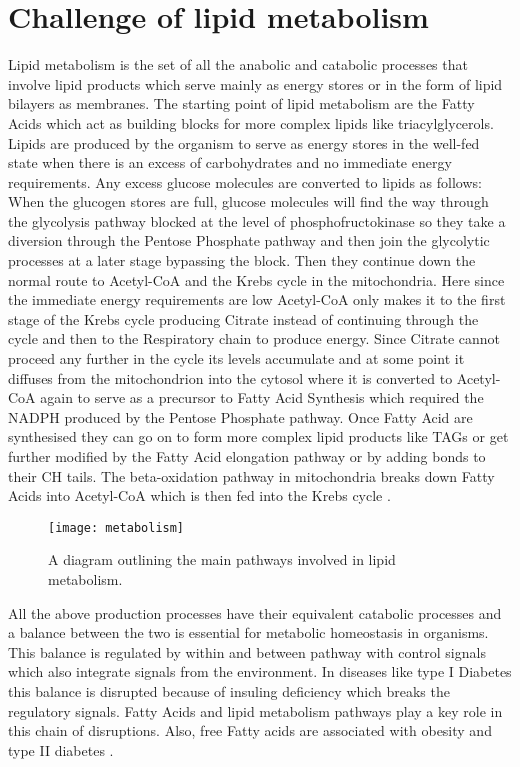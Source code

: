 \section{Challenge of lipid metabolism}
Lipid metabolism is the set of all the anabolic and catabolic
processes that involve lipid products which serve mainly as energy
stores or in the form of lipid bilayers as membranes. The starting
point of lipid metabolism are the Fatty Acids which act as building
blocks for more complex lipids like triacylglycerols. Lipids are
produced by the organism to serve as energy stores in the well-fed state when there is an excess
of carbohydrates and no immediate energy requirements. Any excess
glucose molecules are converted to lipids as follows: When the
glucogen stores are full, glucose molecules will find the way through
the glycolysis pathway blocked at the level of phosphofructokinase so
they take a diversion through the Pentose Phosphate pathway and then
join the glycolytic processes at a later stage bypassing the
block. Then they continue down the normal route to Acetyl-CoA and the
Krebs cycle in the mitochondria. Here since the immediate energy requirements
are low Acetyl-CoA only makes it to the first stage of the Krebs cycle
producing Citrate instead of continuing through the cycle and then to
the Respiratory chain to produce energy. Since Citrate cannot proceed any further in the
cycle its levels accumulate and at some point it diffuses from
the mitochondrion into the cytosol where it is converted to Acetyl-CoA
again to serve as a precursor to Fatty Acid Synthesis which required
the NADPH produced by the Pentose Phosphate pathway. Once Fatty Acid
are synthesised they can go on to form more complex lipid products like
TAGs or get further modified by the Fatty Acid elongation pathway or
by adding bonds to their CH tails. The beta-oxidation pathway in
mitochondria breaks down Fatty Acids into Acetyl-CoA which is then fed
into the Krebs cycle \cite [] {salway2013metabolism}.

\begin{figure}[htbp!]
\centering
\texttt{[image: metabolism]}
\caption[Lipid metabolism and interacting pathways]{A diagram
  outlining the main pathways involved in lipid metabolism.}
\label{fig:lipid_metabolism}
\end{figure}

All the above production processes have their equivalent catabolic
processes and a balance between the two is essential for metabolic
homeostasis in organisms. This balance is regulated by within and
between pathway with control signals which also integrate signals from the
environment. In diseases like type I Diabetes this balance is
disrupted because of insuling deficiency which breaks the regulatory
signals. Fatty Acids and lipid metabolism pathways play a key role
in this chain of disruptions. Also, free Fatty acids are
associated with obesity and type II diabetes \cite [] {boden2002free}.

